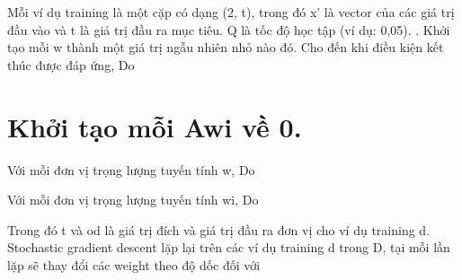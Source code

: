 Mỗi ví dụ training là một cặp có dạng (2, t), trong đó x' là vector của các giá trị đầu vào và t là giá trị đầu ra mục tiêu. Q là tốc độ học tập (ví dụ: 0,05). . Khởi tạo mỗi w thành một giá trị ngẫu nhiên nhỏ nào đó. Cho đến khi điều kiện kết thúc được đáp ứng, Do

\section{Khởi tạo mỗi Awi về 0.}

Với mỗi đơn vị trọng lượng tuyến tính w, Do

Với mỗi đơn vị trọng lượng tuyến tính wi, Do

Trong đó t và od là giá trị đích và giá trị đầu ra đơn vị cho ví dụ training d. Stochastic gradient descent lặp lại trên các ví dụ training d trong D, tại mỗi lần lặp sẽ thay đổi các weight theo độ dốc đối với

